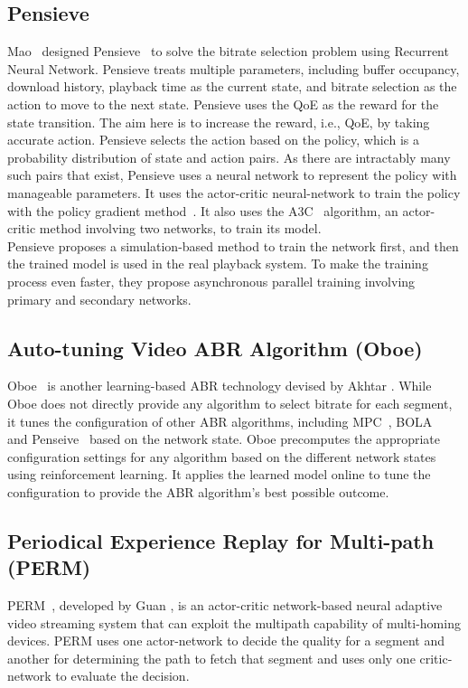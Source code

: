 \subsection{Pensieve}
Mao \etal\ designed Pensieve~\cite{mao2017neural} to solve the bitrate selection problem using Recurrent Neural Network. Pensieve treats multiple parameters, including buffer occupancy, download history, playback time as the current state, and bitrate selection as the action to move to the next state. Pensieve uses the QoE as the reward for the state transition. The aim here is to increase the reward, i.e., QoE, by taking accurate action. Pensieve selects the action based on the policy, which is a probability distribution of state and action pairs. As there are intractably many such pairs that exist, Pensieve uses a neural network to represent the policy with manageable parameters. It uses the actor-critic neural-network to train the policy with the policy gradient method~\cite{sutton1999policy}. It also uses the A3C~\cite{10.5555/3045390.3045594} algorithm, an actor-critic method involving two networks, to train its model.\\
Pensieve proposes a simulation-based method to train the network first, and then the trained model is used in the real playback system. To make the training process even faster, they propose asynchronous parallel training involving primary and secondary networks.

\subsection{Auto-tuning Video ABR Algorithm (Oboe)}
Oboe~\cite{Akhtar2018} is another learning-based ABR technology devised by Akhtar \etal. While Oboe does not directly provide any algorithm to select bitrate for each segment, it tunes the configuration of other ABR algorithms, including MPC~\cite{yin2015control,10.1145/2670518.2673877}, BOLA~\cite{Spiteri2016} and Penseive~\cite{mao2017neural} based on the network state. Oboe precomputes the appropriate configuration settings for any algorithm based on the different network states using reinforcement learning. It applies the learned model online to tune the configuration to provide the ABR algorithm's best possible outcome.


\subsection{Periodical Experience Replay for Multi-path (PERM)}
PERM~\cite{9155492}, developed by Guan \etal, is an actor-critic network-based neural adaptive video streaming system that can exploit the multipath capability of multi-homing devices. PERM uses one actor-network to decide the quality for a segment and another for determining the path to fetch that segment and uses only one critic-network to evaluate the decision.

